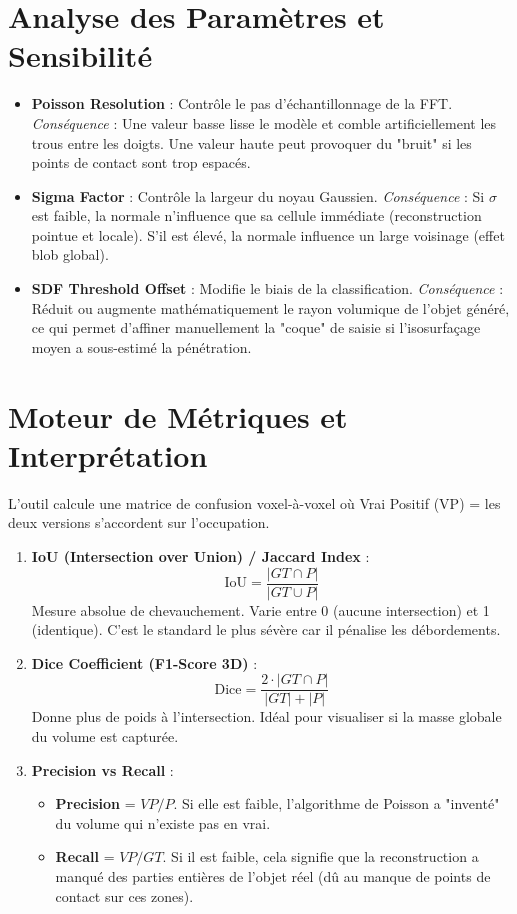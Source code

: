 \documentclass[11pt, a4paper]{article}
\begin{document}
\section{Analyse des Paramètres et Sensibilité}

\begin{tcolorbox}[colback=gray!5!white,colframe=gray!75!black,title=Comportement des leviers de réglage]
\begin{itemize}
    \item \textbf{Poisson Resolution} : Contrôle le pas d'échantillonnage de la FFT. \textit{Conséquence} : Une valeur basse lisse le modèle et comble artificiellement les trous entre les doigts. Une valeur haute peut provoquer du "bruit" si les points de contact sont trop espacés.
    \item \textbf{Sigma Factor} : Contrôle la largeur du noyau Gaussien. \textit{Conséquence} : Si $\sigma$ est faible, la normale n'influence que sa cellule immédiate (reconstruction pointue et locale). S'il est élevé, la normale influence un large voisinage (effet blob global).
    \item \textbf{SDF Threshold Offset} : Modifie le biais de la classification. \textit{Conséquence} : Réduit ou augmente mathématiquement le rayon volumique de l'objet généré, ce qui permet d'affiner manuellement la "coque" de saisie si l'isosurfaçage moyen a sous-estimé la pénétration.
\end{itemize}
\end{tcolorbox}

\section{Moteur de Métriques et Interprétation}

L'outil calcule une matrice de confusion voxel-à-voxel où Vrai Positif (VP) = les deux versions s'accordent sur l'occupation.

\begin{enumerate}
    \item \textbf{IoU (Intersection over Union) / Jaccard Index} :
    \[ \text{IoU} = \frac{|GT \cap P|}{|GT \cup P|} \]
    Mesure absolue de chevauchement. Varie entre 0 (aucune intersection) et 1 (identique). C'est le standard le plus sévère car il pénalise les débordements.
    \item \textbf{Dice Coefficient (F1-Score 3D)} :
    \[ \text{Dice} = \frac{2 \cdot |GT \cap P|}{|GT| + |P|} \]
    Donne plus de poids à l'intersection. Idéal pour visualiser si la masse globale du volume est capturée.
    \item \textbf{Precision vs Recall} :
    \begin{itemize}
        \item \textbf{Precision} = $VP / P$. Si elle est faible, l'algorithme de Poisson a "inventé" du volume qui n'existe pas en vrai.
        \item \textbf{Recall} = $VP / GT$. Si il est faible, cela signifie que la reconstruction a manqué des parties entières de l'objet réel (dû au manque de points de contact sur ces zones).
    \end{itemize}
\end{enumerate}
\end{document}
